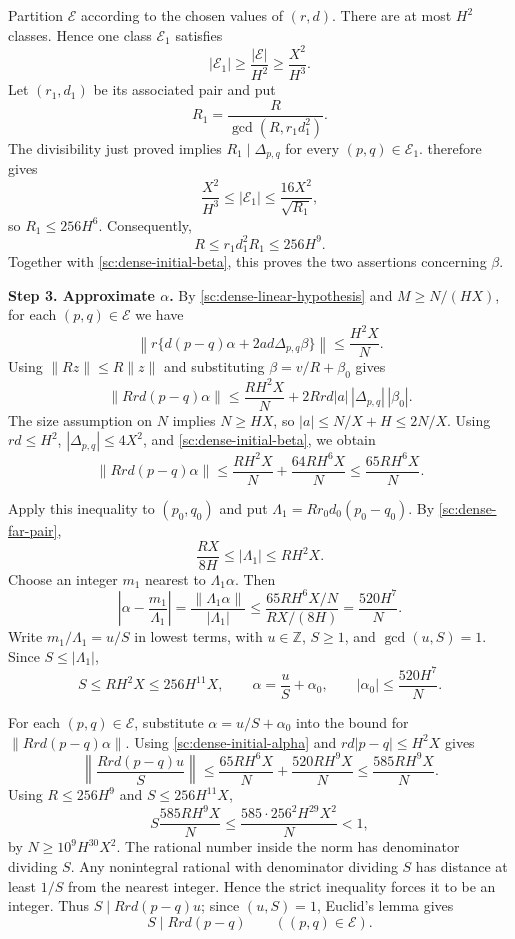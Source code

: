 \documentclass[twoside]{aomart}
\makeatletter
\theoremstyle{paperplain}
\theoremstyle{paperdefinition}
\renewenvironment{proof}[1][\proofname]{\par\pushQED{\qed}%
  \normalfont\topsep6\p@\@plus3\p@\relax\trivlist
  \item[\hskip\labelsep\itshape #1\@addpunct{.}]\ignorespaces
}{\popQED\endtrivlist\@endpefalse}
\numberwithin{equation}{section}
\makeatother
\begin{document}
\begin{proof}
Partition $\mathcal E$ according to the chosen values of $(r,d)$.
There are at most $H^2$ classes. Hence one class $\mathcal E_1$ satisfies
\[
 |\mathcal E_1|\ge\frac{|\mathcal E|}{H^2}\ge\frac{X^2}{H^3}.
\]
Let $(r_1,d_1)$ be its associated pair and put
\[
 R_1=\frac{R}{\gcd(R,r_1d_1^2)}.
\]
The divisibility just proved implies
$R_1\mid\Delta_{p,q}$ for every $(p,q)\in\mathcal E_1$. 
therefore gives
\[
 \frac{X^2}{H^3}
 \le |\mathcal E_1|
 \le \frac{16X^2}{\sqrt{R_1}},
\]
so $R_1\le256H^6$. Consequently,
\[
 R\le r_1d_1^2R_1\le256H^9.
\]
Together with \eqref{sc:dense-initial-beta}, this proves the two
assertions concerning $\beta$.

\par
\medskip
\noindent\textbf{Step 3. Approximate $\alpha$.}
By \eqref{sc:dense-linear-hypothesis} and $M\ge N/(HX)$,
for each $(p,q)\in\mathcal E$ we have
\[
 \left\|r\{d(p-q)\alpha+2ad\Delta_{p,q}\beta\}\right\|
 \le \frac{H^2X}{N}.
\]
Using $\|Rz\|\le R\|z\|$ and substituting $\beta=v/R+\beta_0$
gives
\[
 \|Rrd(p-q)\alpha\|
 \le \frac{RH^2X}{N}
 +2Rrd|a|\,|\Delta_{p,q}|\,|\beta_0|.
\]
The size assumption on $N$ implies $N\ge HX$, so
$|a|\le N/X+H\le2N/X$. Using
$rd\le H^2$, $|\Delta_{p,q}|\le4X^2$, and
\eqref{sc:dense-initial-beta}, we obtain
\begin{equation*}
 \|Rrd(p-q)\alpha\|
 \le \frac{RH^2X}{N}+\frac{64RH^6X}{N}
 \le \frac{65RH^6X}{N}.
\end{equation*}

Apply this inequality to $(p_0,q_0)$ and put
$\Lambda_1=Rr_0d_0(p_0-q_0)$. By \eqref{sc:dense-far-pair},
\[
 \frac{RX}{8H}\le|\Lambda_1|\le RH^2X.
\]
Choose an integer $m_1$ nearest to $\Lambda_1\alpha$. Then
\[
 \left|\alpha-\frac{m_1}{\Lambda_1}\right|
 =\frac{\|\Lambda_1\alpha\|}{|\Lambda_1|}
 \le\frac{65RH^6X/N}{RX/(8H)}
 =\frac{520H^7}{N}.
\]
Write $m_1/\Lambda_1=u/S$ in lowest terms, with $u\in\mathbb Z$,
$S\ge1$, and $\gcd(u,S)=1$. Since $S\le|\Lambda_1|$,
\begin{equation}
 S\le RH^2X\le256H^{11}X,
 \qquad
 \alpha=\frac uS+\alpha_0,
 \qquad
 |\alpha_0|\le\frac{520H^7}{N}.
 \label{sc:dense-initial-alpha}
\end{equation}

For each $(p,q)\in\mathcal E$, substitute
$\alpha=u/S+\alpha_0$ into the bound for $\|Rrd(p-q)\alpha\|$.
Using \eqref{sc:dense-initial-alpha} and $rd|p-q|\le H^2X$ gives
\[
 \left\|\frac{Rrd(p-q)u}{S}\right\|
 \le \frac{65RH^6X}{N}+\frac{520RH^9X}{N}
 \le \frac{585RH^9X}{N}.
\]
Using $R\le256H^9$ and $S\le256H^{11}X$,
\[
 S\frac{585RH^9X}{N}
 \le \frac{585\cdot256^2H^{29}X^2}{N}<1,
\]
by $N\ge10^9H^{30}X^2$. The rational number inside the norm has
denominator dividing $S$. Any nonintegral rational with denominator
dividing $S$ has distance at least $1/S$ from the nearest integer.
Hence the strict inequality forces it to be an integer. Thus
$S\mid Rrd(p-q)u$; since $(u,S)=1$, Euclid's lemma gives
\begin{equation*}
 S\mid Rrd(p-q)
 \qquad ((p,q)\in\mathcal E).
\end{equation*}


\end{proof}
\end{document}
